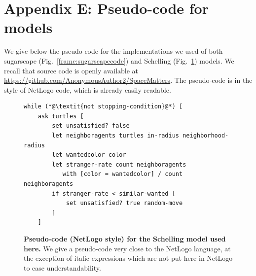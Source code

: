 \documentclass{JASSS}
\begin{document}
\section{Appendix E: Pseudo-code for models}
\label{app:code}

We give below the pseudo-code for the implementations we used of both sugarscape (Fig.~\ref{frame:sugarscapecode}) and Schelling (Fig.~\ref{frame:schellingcode}) models. We recall that source code is openly available at \url{https://github.com/AnonymousAuthor2/SpaceMatters}. The pseudo-code is in the style of NetLogo code, which is already easily readable.



\begin{figure}[!t]
\caption{\textbf{Pseudo-code (NetLogo style) for the Schelling model used here.} We give a pseudo-code very close to the NetLogo language, at the exception of italic expressions which are not put here in NetLogo to ease understandability.}\label{frame:schellingcode}
\bigskip
\begin{mdframed}
\begin{lstlisting}
while (*@\textit{not stopping-condition}@*) [
	ask turtles [
		set unsatisfied? false
		let neighboragents turtles in-radius neighborhood-radius
		let wantedcolor color
		let stranger-rate count neighboragents
		   with [color = wantedcolor] / count neighboragents
		if stranger-rate < similar-wanted [
			set unsatisfied? true random-move
		]
	]
    \end{lstlisting}
    \end{mdframed}
\end{figure}
\end{document}
